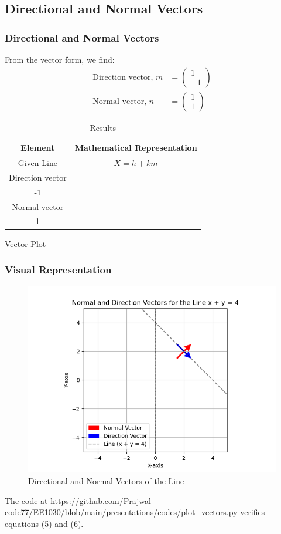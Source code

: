 \documentclass{beamer}
\newcommand{\myvec}[1]{\begin{pmatrix}#1\end{pmatrix}}
\begin{document}
\subsection{Directional and Normal Vectors}
\begin{frame}
  \frametitle{Directional and Normal Vectors}
  From the vector form, we find:
  \begin{align}
    \text{Direction vector, } m &= \myvec{1 \\ -1} \\
    \text{Normal vector, } n &= \myvec{1 \\ 1}
  \end{align}

  \begin{table}[h!]
    \centering
    \begin{tabular}{|c|c|}
      \hline
      \textbf{Element} & \textbf{Mathematical Representation} \\
      \hline
      Given Line & \( X = h + km \) \\
      \hline
      Direction vector & \( m = \myvec{1 \\ -1} \) \\
      \hline
      Normal vector & \( n = \myvec{1 \\ 1} \) \\
      \hline
    \end{tabular}
    \caption{Results}
    \label{tab:info}
  \end{table}
\end{frame}

\begin{frame}{Vector Plot}
  \frametitle{Visual Representation}
  \begin{figure}
    \centering
    \includegraphics[width=0.5\linewidth]{Figures/Figure_1.png}
    \caption{Directional and Normal Vectors of the Line}
    \label{fig:vectors}
  \end{figure}

  The code at 
  \url{https://github.com/Prajwal-code77/EE1030/blob/main/presentations/codes/plot_vectors.py} 
  verifies equations (5) and (6).
\end{frame}
\end{document}
